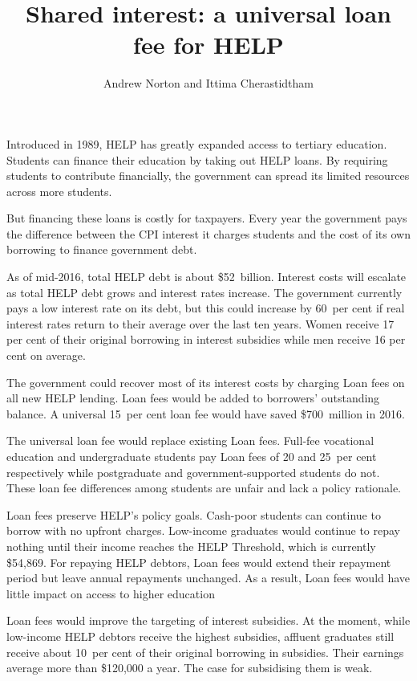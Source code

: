 \documentclass[embargoed]{grattan}
\title{Shared interest: a universal loan fee for \gls{HELP}}
\author{Andrew Norton and Ittima Cherastidtham}
\begin{document}
\setlength{\overviewExtra}{-3pt}
\begin{overview}
Introduced in 1989, \gls{HELP} has greatly expanded access to tertiary education.
Students can finance their education by taking out \gls{HELP} loans.
By requiring students to contribute financially, the government can spread its limited resources across more students.

But financing these loans is costly for taxpayers.
Every year the government pays the difference between the \gls{CPI} interest it charges students and the cost of its own borrowing to finance government debt. 

As of mid-2016, total \gls{HELP} debt is about \$52~billion.
Interest costs will escalate as total \gls{HELP} debt grows and interest rates increase.
The government currently pays a low interest rate on its debt, but this could increase by 60~per cent if real interest rates return to their average over the last ten years. Women receive 17 per cent of their original borrowing in interest subsidies while men receive 16 per cent on average.

The government could recover most of its interest costs by charging \gls{Loan fees} on all new \gls{HELP} lending. Loan fees would be added to borrowers' outstanding balance.
A universal 15~per cent loan fee would have saved \$700~million in 2016.

The universal loan fee would replace existing \gls{Loan fees}.
Full-fee vocational education and undergraduate students pay \gls{Loan fees} of 20 and 25~per cent respectively while postgraduate and government-supported students do not.
These loan fee differences among students are unfair and lack a policy rationale.

\Gls{Loan fees} preserve \gls{HELP}'s policy goals.
Cash-poor students can continue to borrow with no upfront charges.
Low-income graduates would continue to repay nothing until their income reaches the \gls{HELP} \gls{Threshold}, which is currently \$54,869.
For repaying \gls{HELP} debtors, \gls{Loan fees} would extend their repayment period but leave annual repayments unchanged. As a result, \gls{Loan fees} would have little impact on access to higher education

Loan fees would improve the targeting of interest subsidies.
At the moment, while low-income \gls{HELP} debtors receive the highest subsidies, affluent graduates still receive about 10~per cent of their original borrowing in subsidies.
Their earnings average more than \$120,000 a year.
The case for subsidising them is weak.


\end{overview}
\end{document}

